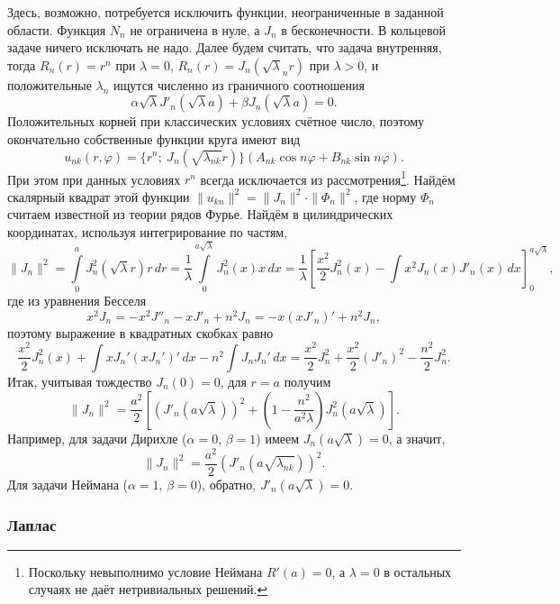 Здесь, возможно, потребуется исключить функции, неограниченные в
заданной области. Функция $ N_n $ не ограничена в нуле, а $ J_n $ в бесконечности.
В кольцевой задаче ничего исключать не надо. Далее будем считать, что задача
внутренняя, тогда $ R_n(r) = r^n $ при $ \lambda = 0 $, $ R_n(r) =
J_n(\sqrt\lambda_n r) $ при $ \lambda > 0 $, и положительные $
\lambda_n $ ищутся
численно из
граничного соотношения  
\[
    \alpha \sqrt\lambda J'_n(\sqrt\lambda a) + \beta J_n(\sqrt\lambda a) = 0.
\]
Положительных корней при классических условиях счётное число, поэтому окончательно собственные функции
круга имеют вид 
\[
u_{nk}(r, \varphi) = \{r^n; \ J_n(\sqrt{\lambda_{nk}} r)\}(A_{nk}\cos n\varphi +
  B_{nk}\sin
  n\varphi).
\]
При этом при данных условиях $ r^n $ всегда исключается из
рассмотрения\footnote{Поскольку невыполнимо условие Неймана $ R'(a) = 0 $, а $
\lambda = 0 $ в остальных случаях не даёт нетривиальных решений.}. Найдём скалярный квадрат этой функции $ \|u_{kn}\|^2 =
\|J_n\|^2\cdot\|\Phi_n\|^2 $, где норму $ \Phi_n $ считаем известной из
теории рядов Фурье. Найдём в цилиндрических координатах, используя
интегрирование по частям,
\[
    \|J_n\|^2 = \int\limits_{0}^{a} J^2_n(\sqrt\lambda r)r\,dr =
    \frac{1}{\lambda}\int\limits_{0}^{a\sqrt\lambda}J^2_n(x)x\,dx =
    \frac{1}{\lambda} \left[ \frac{x^2}{2}J^2_n(x) -
    \int x^2 J_n(x)J'_n(x)\,dx  \right]^{a\sqrt\lambda}_0,
\]
где из уравнения Бесселя
\[
  x^2 J_n = -x^2 J''_n - xJ'_n + n^2J_n = - x(xJ'_n)' + n^2 J_n,
\]
поэтому выражение в квадратных скобках равно
\[
  \frac{x^2}{2} J^2_n(x) + \int xJ_n' (xJ_n')'\,dx - n^2 \int J_n J_n' \, dx
  =
  \frac{x^2}{2} J^2_n + \frac{x^2}{2} (J'_n)^2 - \frac{n^2}{2} J^2_n.
\]
Итак, учитывая тождество $ J_n(0) = 0 $, для $ r = a $ получим
\[
    \|J_n\|^2 = \frac{a^2}{2} \left[ (J'_n(a\sqrt\lambda))^2 + \left( 1 -
    \frac{n^2}{a^2\lambda} \right) J_n^2 (a\sqrt\lambda) \right].
\]
Например, для задачи Дирихле ($ \alpha = 0 $, $ \beta = 1 $) имеем $
J_n(a\sqrt\lambda) = 0 $, а значит,  
\[
  \|J_n\|^2 = \frac{a^2}{2} (J'_n(a\sqrt{\lambda_{nk}}))^2.
\]
Для задачи Неймана ($ \alpha = 1 $, $ \beta = 0 $), обратно, $ J'_n(a\sqrt\lambda) = 0. $




\subsubsection{Лаплас}
